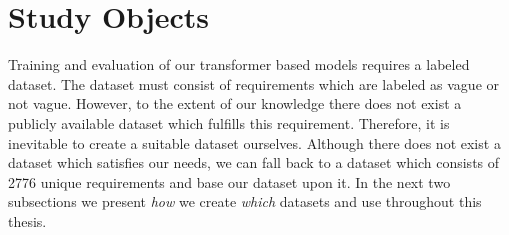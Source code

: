 \section{Study Objects}
\label{chp:study:sec:study_objects}


Training and evaluation of our transformer based models requires a labeled dataset.
The dataset must consist of requirements which are labeled as vague or not vague.
However, to the extent of our knowledge there does not exist a publicly available dataset which fulfills this requirement.
Therefore, it is inevitable to create a suitable dataset ourselves.
Although there does not exist a dataset which satisfies our needs, we can fall back to a dataset which consists of 2776 unique requirements \parencite{Kummeth:2020} and base our dataset upon it.
In the next two subsections we present \textit{how} we create \textit{which} datasets and use throughout this thesis.



